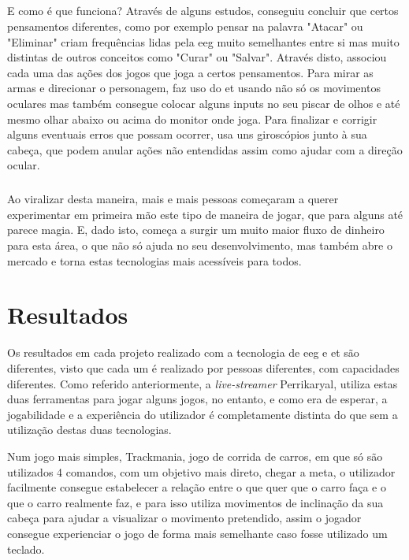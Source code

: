 \documentclass{report}
\begin{document}
\paragraph{}
E como é que funciona? Através de alguns estudos, conseguiu concluir que certos pensamentos diferentes, como por exemplo pensar na palavra "Atacar" ou "Eliminar" criam frequências lidas pela \ac{eeg} muito semelhantes entre si mas muito distintas de outros conceitos como "Curar" ou "Salvar". Através disto, associou cada uma das ações dos jogos que joga a certos pensamentos. Para mirar as armas e direcionar o personagem, faz uso do \ac{et} usando não só os movimentos oculares mas também consegue colocar alguns inputs no seu piscar de olhos e até mesmo olhar abaixo ou acima do monitor onde joga. Para finalizar e corrigir alguns eventuais erros que possam ocorrer, usa uns giroscópios junto à sua cabeça, que podem anular ações não entendidas assim como ajudar com a direção ocular.
\paragraph{}
Ao viralizar desta maneira, mais e mais pessoas começaram a querer experimentar em primeira mão este tipo de maneira de jogar, que para alguns até parece magia. E, dado isto, começa a surgir um muito maior fluxo de dinheiro para esta área, o que não só ajuda no seu desenvolvimento, mas também abre o mercado e torna estas tecnologias mais acessíveis para todos.

\chapter{Resultados}
\label{chap.resultados}

Os resultados em cada projeto realizado com a tecnologia de  \ac{eeg} e  \ac{et} são diferentes, visto que cada um é realizado por pessoas diferentes, com capacidades diferentes. Como referido anteriormente, a \textit{live-streamer} Perrikaryal, utiliza estas duas ferramentas para jogar alguns jogos, no entanto, e como era de esperar, a jogabilidade e a experiência do utilizador é completamente distinta do que sem a utilização destas duas tecnologias. 

Num jogo mais simples, Trackmania, jogo de corrida de carros, em que só são utilizados 4 comandos, com um objetivo mais direto, chegar a meta, o utilizador facilmente consegue estabelecer a relação entre o que quer que o carro faça e o que o carro realmente faz, e para isso utiliza movimentos de inclinação da sua cabeça para ajudar a visualizar o movimento pretendido, assim o jogador consegue experienciar o jogo de forma mais semelhante caso fosse utilizado um teclado.
\end{document}
